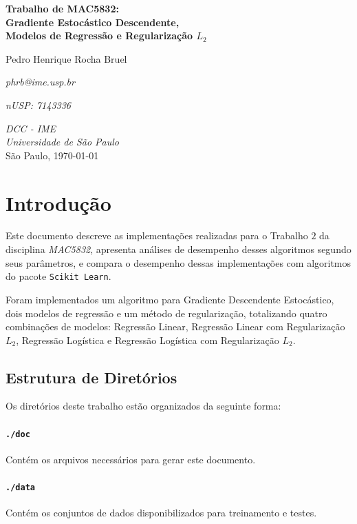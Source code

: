 \documentclass[a4paper, 12pt]{article}
\newcommand{\rom}[1]{\uppercase\expandafter{\romannumeral #1\relax}}
\begin{document}
\begin{titlepage}
    \centering
    \vspace*{4cm}
    \textbf{\Large{Trabalho \rom{2} de MAC5832: \\ Gradiente Estocástico Descendente, \\
    Modelos de Regressão e Regularização $L_2$}}\\

    \vskip 1cm

    Pedro Henrique Rocha Bruel

    \emph{phrb@ime.usp.br}

    \emph{nUSP: 7143336}

    \vfill
    \normalsize{\emph{DCC - IME\\
    Universidade de São Paulo}\\}
    \normalsize{São Paulo, \today}
\end{titlepage}

\section{Introdução} \label{sec:intro}

Este documento descreve as implementações realizadas para o Trabalho $2$ da
disciplina \textit{MAC5832}, apresenta análises de desempenho desses algoritmos
segundo seus parâmetros, e compara o desempenho dessas implementações com
algoritmos do pacote \texttt{Scikit Learn}.

Foram implementados um algoritmo para Gradiente Descendente Estocástico, dois
modelos de regressão e um método de regularização, totalizando quatro
combinações de modelos: Regressão Linear, Regressão Linear com Regularização
$L_2$, Regressão Logística e Regressão Logística com Regularização $L_2$.

\subsection{Estrutura de Diretórios}

Os diretórios deste trabalho estão organizados da
seguinte forma:

\paragraph{\texttt{./doc}} Contém os arquivos necessários
para gerar este documento.

\paragraph{\texttt{./data}} Contém os conjuntos de dados
disponibilizados para treinamento e testes.
\end{document}
